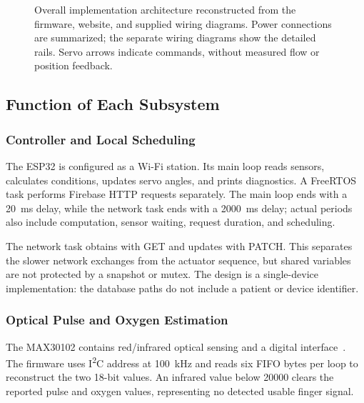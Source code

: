 \begin{figure}[!t]
{}
\caption{Overall implementation architecture reconstructed from the firmware, website, and supplied wiring diagrams. Power connections are summarized; the separate wiring diagrams show the detailed rails. Servo arrows indicate commands, without measured flow or position feedback.}\label{fig:architecture}
\end{figure}

\subsection{Function of Each Subsystem}
\subsubsection{Controller and Local Scheduling}
The ESP32 is configured as a Wi-Fi station. Its main loop reads sensors, calculates conditions, updates servo angles, and prints diagnostics. A FreeRTOS task performs Firebase HTTP requests separately. The main loop ends with a 20~ms delay, while the network task ends with a 2000~ms delay; actual periods also include computation, sensor waiting, request duration, and scheduling.

The network task obtains  with GET and updates  with PATCH. This separates the slower network exchanges from the actuator sequence, but shared variables are not protected by a snapshot or mutex. The design is a single-device implementation: the database paths do not include a patient or device identifier.

\subsubsection{Optical Pulse and Oxygen Estimation}
The MAX30102 contains red/infrared optical sensing and a digital interface~\cite{max30102}. The firmware uses I\textsuperscript{2}C address  at 100~kHz and reads six FIFO bytes per loop to reconstruct the two 18-bit values. An infrared value below 20000 clears the reported pulse and oxygen values, representing no detected usable finger signal.

